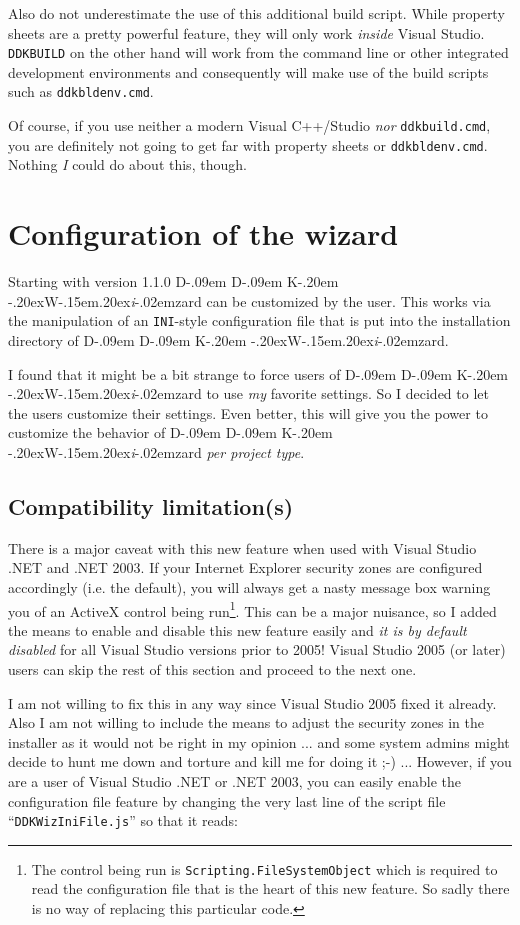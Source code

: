 \documentclass[a4paper,titlepage]{report}
\def\ddkwiz{\texorpdfstring{D\kern-.09em D\kern-.09em K\kern-.20em \raise-.20ex\hbox{W}\kern-.15em\raise.20ex\hbox{\it{i}}\kern-.02em{zard}}{DDKWizard}}
\begin{document}
Also do not underestimate the use of this additional build script. While property sheets
are a pretty powerful feature, they will only work \emph{inside} Visual Studio.
\texttt{DDKBUILD} on the other hand will work from the command line or other integrated
development environments and consequently will make use of the build scripts such as
\texttt{ddkbldenv.cmd}.

Of course, if you use neither a modern Visual C++/Studio \emph{nor} \texttt{ddkbuild.cmd}, you are
definitely not going to get far with property sheets or \texttt{ddkbldenv.cmd}. Nothing \emph{I}
could do about this, though.

\chapter{Configuration of the wizard}\thispagestyle{fancy}
Starting with version 1.1.0 \ddkwiz{} can be customized by the user. This works
via the manipulation of an \texttt{INI}-style configuration file that is put into the
installation directory of \ddkwiz{}.

I found that it might be a bit strange to force users of \ddkwiz{} to use \emph{my}
favorite settings. So I decided to let the users customize their settings. Even better,
this will give you the power to customize the behavior of \ddkwiz{} \emph{per project
type}.

\section{Compatibility limitation(s)}
\label{compat:activex}
There is a major caveat with this new feature when used with
Visual Studio .NET and .NET 2003. If your Internet Explorer security zones
are configured accordingly (i.e. the default), you will always get a nasty message box
warning you of an ActiveX control being run\footnote{The control being run is
\texttt{Scripting.FileSystemObject} which is required to read the configuration
file that is the heart of this new feature. So sadly there is no way of
replacing this particular code.}. This can be a major nuisance, so I
added the means to enable and disable this new feature easily and \emph{it is by default
disabled} for all Visual Studio versions prior to 2005! Visual Studio 2005 (or later)
users can skip the rest of this section and proceed to the next one.

I am not willing to fix this in any way since Visual Studio 2005 fixed it already.
Also I am not willing to include the means to adjust the security zones in
the installer as it would not be right in my opinion ... and some system admins
might decide to hunt me down and torture and kill me for doing it \textsf{;-)} ...
However, if you are a user of Visual Studio .NET or .NET 2003, you can easily
enable the configuration file feature by changing the very last line of the
script file ``\texttt{DDKWizIniFile.js}'' so that it reads:
\end{document}
